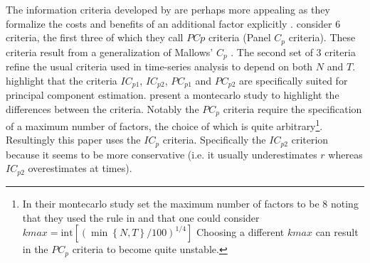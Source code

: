 \documentclass[11pt]{article}
\begin{document}
The information criteria developed by \citet{bai2002determining} are perhaps more appealing as they formalize the costs and benefits of an additional factor explicitly \citep{stock2011dynamic}. \citet{bai2002determining} consider $6$ criteria, the first three of which they call $PCp$ criteria (Panel $C_p$ criteria). These criteria result from a generalization of Mallows' $C_p$ \citep{mallows1973some}. The second set of $3$ criteria refine the usual criteria used in time-series analysis to depend on both $N$ and $T$. \citet{bai2002determining} highlight that the criteria $IC_{p1}$, $IC_{p2}$, $PC_{p1}$ and $PC_{p2}$ are specifically suited for principal component estimation. \citet{bai2002determining} present a montecarlo study to highlight the differences between the criteria. Notably the $PC_{p}$ criteria require the specification of a maximum number of factors, the choice of which is quite arbitrary\footnote{In their montecarlo study \citet{bai2002determining} set the maximum number of factors to be $8$ noting that they used the rule in \citet{schwert2002tests} and that one could consider $kmax=\text{int}[(\min\left\{N, T\right\}/100)^{1/4}]$  Choosing a different $kmax$ can result in the $PC_p$ criteria to become quite unstable.}. Resultingly this paper uses the $IC_p$ criteria. Specifically the $IC_{p2}$ criterion because it seems to be more conservative (i.e. it usually underestimates $r$ whereas $IC_{p2}$ overestimates at times). 
\end{document}
